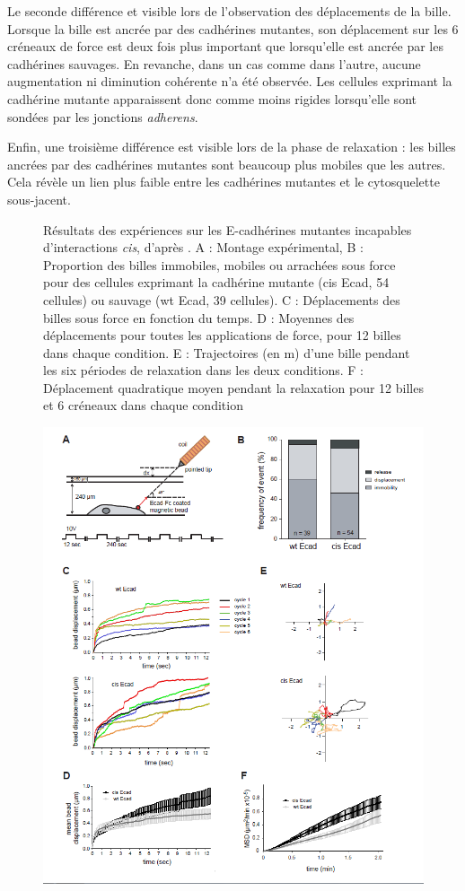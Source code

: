  Le seconde différence et visible lors de l'observation des déplacements de la bille. Lorsque la bille est ancrée par des cadhérines mutantes, son déplacement sur les 6 créneaux de force est deux fois plus important que lorsqu'elle est ancrée par les cadhérines sauvages. En revanche, dans un cas comme dans l'autre, aucune augmentation ni diminution cohérente n'a été observée. Les cellules exprimant la cadhérine mutante apparaissent donc comme moins rigides lorsqu'elle sont sondées par les jonctions \textit{adherens}. 
 
 Enfin, une troisième différence est visible lors de la phase de relaxation : les billes ancrées par des cadhérines mutantes sont beaucoup plus mobiles que les autres. Cela révèle un lien plus faible entre les cadhérines mutantes et le cytosquelette sous-jacent. 
 \newpage

 \begin{figure}[h!]
\caption{\small Résultats des expériences sur les E-cadhérines mutantes incapables d'interactions \textit{cis}, d'après \cite{Strale}. A : Montage expérimental, B : Proportion des billes immobiles, mobiles ou arrachées sous force pour des cellules exprimant la cadhérine mutante (cis Ecad, 54 cellules) ou sauvage (wt Ecad, 39 cellules). C : Déplacements des billes sous force en fonction du temps. D : Moyennes des déplacements pour toutes les applications de force, pour 12 billes dans chaque condition. E : Trajectoires (en \micro m) d'une bille pendant les six périodes de relaxation dans les deux conditions. F : Déplacement quadratique moyen pendant la relaxation pour 12 billes et 6 créneaux dans chaque condition}
\end{figure} 
     
 \begin{figure}
 \includegraphics[scale=0.7]{Figures/Strale.png} 

 \end{figure}


 
 
 
 
%